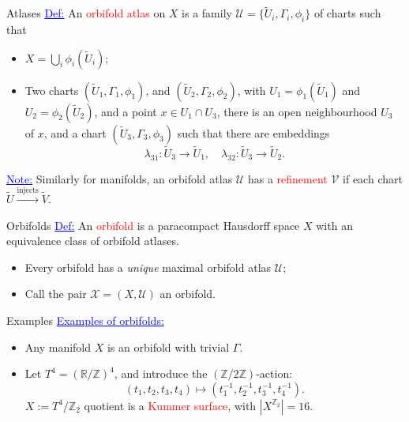 \documentclass[aspectratio=169,xcolor=dvipsnames]{beamer}
\newcommand{\ra}{\rightarrow}
\newcommand{\ZZ}{\mathbb{Z}}
\newcommand{\RR}{\mathbb{R}}
\begin{document}
\begin{frame}{Atlases}
	\textcolor{blue}{\underline{Def:}} An \textcolor{red}{orbifold atlas} on $X$ is a family $\mathcal{U} = \{\widetilde{U}_{i}, \Gamma_{i}, \phi_{i}\}$ of charts such that
	\begin{itemize}
		\item $X = \bigcup_{i} \phi_{i}(\widetilde{U}_{i})$;
		\item Two charts $(\widetilde{U}_{1}, \Gamma_{1}, \phi_{1})$, and $(\widetilde{U}_{2}, \Gamma_{2}, \phi_{2})$, with $U_{1} = \phi_{1}(\widetilde{U}_{1})$ and $U_{2} = \phi_{2}(\widetilde{U}_{2})$, and a point $x \in U_{1} \cap U_{3}$, there is an open neighbourhood $U_{3}$ of $x$, and a chart $(\widetilde{U}_{3}, \Gamma_{3}, \phi_{3})$ such that there are embeddings
		\[
		\lambda_{31} : \widetilde{U}_{3} \ra \widetilde{U}_{1}, \quad \lambda_{32} : \widetilde{U}_{3} \ra \widetilde{U}_{2}.
		\]
	\end{itemize}
	\textcolor{blue}{\underline{Note:}} Similarly for manifolds, an orbifold atlas $\mathcal{U}$ has a \textcolor{red}{refinement} $\mathcal{V}$ if each chart $\widetilde{U} \overset{\text{injects}}{\longrightarrow} \widetilde{V}$.
\end{frame}

\begin{frame}{Orbifolds}
	\textcolor{blue}{\underline{Def:}} An \textcolor{red}{orbifold} is a paracompact Hausdorff space $X$ with an equivalence class of orbifold atlases.
	\begin{itemize}
		\item Every orbifold has a \emph{unique} maximal orbifold atlas $\mathcal{U}$;
		\item Call the pair $\mathcal{X} = (X, \mathcal{U})$ an orbifold.
	\end{itemize}
\end{frame}

\begin{frame}{Examples}
	\textcolor{blue}{\underline{Examples of orbifolds:}}
	\begin{itemize}
		\item Any manifold $X$ is an orbifold with trivial $\Gamma$.
		\item Let $T^{4} = (\RR/\ZZ)^{4}$, and introduce the $(\ZZ/2\ZZ)$-action:
		\[
		(t_{1}, t_{2}, t_{3}, t_{4}) \mapsto (t_{1}^{-1}, t_{2}^{-1}, t_{3}^{-1}, t_{4}^{-1}).
		\]
		$X := T^{4}/\ZZ_{2}$ quotient is a \textcolor{red}{Kummer surface}, with $|X^{\ZZ_{2}}| = 16$.
	\end{itemize}
\end{frame}
\end{document}
